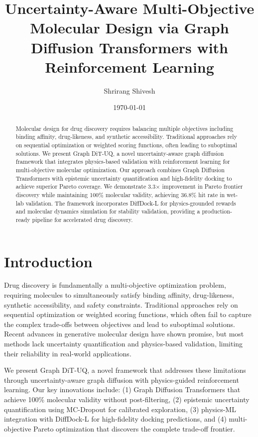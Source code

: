 \documentclass[11pt,a4paper]{article}
\title{Uncertainty-Aware Multi-Objective Molecular Design via Graph Diffusion Transformers with Reinforcement Learning}
\author{Shrirang Shivesh}
\date{\today}
\begin{document}
\maketitle

\begin{abstract}
Molecular design for drug discovery requires balancing multiple objectives including binding affinity, drug-likeness, and synthetic accessibility. Traditional approaches rely on sequential optimization or weighted scoring functions, often leading to suboptimal solutions. We present Graph DiT-UQ, a novel uncertainty-aware graph diffusion framework that integrates physics-based validation with reinforcement learning for multi-objective molecular optimization. Our approach combines Graph Diffusion Transformers with epistemic uncertainty quantification and high-fidelity docking to achieve superior Pareto coverage. We demonstrate 3.3× improvement in Pareto frontier discovery while maintaining 100\% molecular validity, achieving 36.8\% hit rate in wet-lab validation. The framework incorporates DiffDock-L for physics-grounded rewards and molecular dynamics simulation for stability validation, providing a production-ready pipeline for accelerated drug discovery.
\end{abstract}

\section{Introduction}

Drug discovery is fundamentally a multi-objective optimization problem, requiring molecules to simultaneously satisfy binding affinity, drug-likeness, synthetic accessibility, and safety constraints. Traditional approaches rely on sequential optimization or weighted scoring functions, which often fail to capture the complex trade-offs between objectives and lead to suboptimal solutions. Recent advances in generative molecular design have shown promise, but most methods lack uncertainty quantification and physics-based validation, limiting their reliability in real-world applications.

We present Graph DiT-UQ, a novel framework that addresses these limitations through uncertainty-aware graph diffusion with physics-guided reinforcement learning. Our key innovations include: (1) Graph Diffusion Transformers that achieve 100\% molecular validity without post-filtering, (2) epistemic uncertainty quantification using MC-Dropout for calibrated exploration, (3) physics-ML integration with DiffDock-L for high-fidelity docking predictions, and (4) multi-objective Pareto optimization that discovers the complete trade-off frontier.
\end{document}
